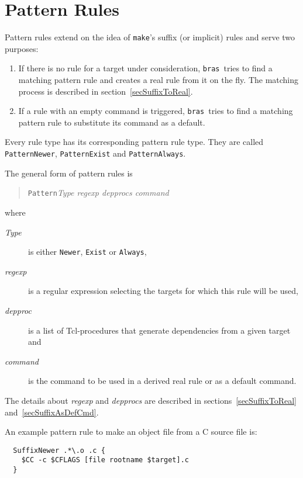 \documentclass[12pt]{article}
\newcommand{\bras}{\texttt{bras}}
\newcommand{\make}{\texttt{make}}
\begin{document}
\section{Pattern Rules}

Pattern rules extend on the idea of \make's suffix (or implicit)
rules and serve two purposes:

\begin{enumerate}
\item If there is no rule for a target under consideration, \bras\
tries to find a matching pattern rule and creates a real rule from it on
the fly. The matching process is described in
section~\ref{secSuffixToReal}.
\item If a rule with an empty command is triggered, \bras\ tries
to find a matching pattern rule to substitute its command as a default.
\end{enumerate}

Every rule type has its corresponding pattern rule type. They
are called
\texttt{PatternNewer}, \texttt{PatternExist} and
\texttt{PatternAlways}.

The general form of pattern rules is
\begin{quote}
\texttt{Pattern}\textit{Type regexp depprocs command}
\end{quote}

where 

\begin{description}
\item[\textit{Type}] is either \texttt{Newer}, \texttt{Exist} or
\texttt{Always},
\item[\textit{regexp}] is a regular expression selecting the targets
for which this rule will be used,
\item[\textit{depproc}] is a list of Tcl-procedures that generate
dependencies from a given target and
\item[\textit{command}] is the command to be used in a derived real
rule or as a default command.
\end{description}

The details about \textit{regexp} and \textit{depprocs} are described
in sections~\ref{secSuffixToReal} and~\ref{secSuffixAsDefCmd}.

An example pattern rule to make an object file from a C source file is:
\begin{verbatim}
  SuffixNewer .*\.o .c {
    $CC -c $CFLAGS [file rootname $target].c
  }
\end{verbatim}
\end{document}
